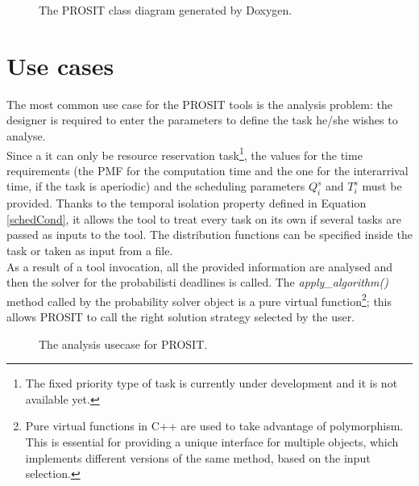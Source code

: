\begin{figure}[H]
  \caption{The PROSIT class diagram generated by Doxygen.}
  \label{automaton}
\end{figure}

\section{Use cases}
% 
%
The most common use case for the PROSIT tools is the analysis problem: the designer is required to enter the parameters to define the task he/she wishes to analyse.\\
Since a it can only be resource reservation task\footnote{The fixed priority type of task is currently under development and it is not available yet.}, the values for the time requirements (the PMF for the computation time and the one for the interarrival time, if the task is aperiodic) and the scheduling parameters \( Q_{i}^s \) and \( T_{i}^s \) must be provided. Thanks to the temporal isolation property defined in Equation \ref{schedCond}, it allows the tool to treat every task on its own if several tasks are passed as inputs to the tool. The distribution functions can be specified inside the task or taken as input from a file.\\
As a result of a tool invocation, all the provided information are analysed and then the solver for the probabilisti deadlines is called. The \emph{apply\_algorithm()} method called by the probability solver object is a pure virtual function\footnote{Pure virtual functions in C++ are used to take advantage of polymorphism. This is essential for providing a unique interface for multiple objects, which implements different versions of the same method, based on the input selection.}; this allows PROSIT to call the right solution strategy selected by the user.

\begin{figure}[H]
  \caption{The analysis usecase for PROSIT.}
  \label{usecase}
\end{figure}